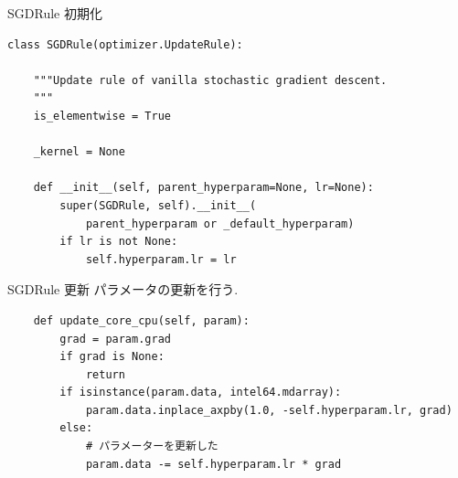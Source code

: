 \begin{frame}[fragile]{SGDRule 初期化}
\begin{verbatim}
class SGDRule(optimizer.UpdateRule):

    """Update rule of vanilla stochastic gradient descent.
    """
    is_elementwise = True

    _kernel = None

    def __init__(self, parent_hyperparam=None, lr=None):
        super(SGDRule, self).__init__(
            parent_hyperparam or _default_hyperparam)
        if lr is not None:
            self.hyperparam.lr = lr
\end{verbatim}
\end{frame}


\begin{frame}[fragile]{SGDRule 更新}
パラメータの更新を行う.

\begin{verbatim}
    def update_core_cpu(self, param):
        grad = param.grad
        if grad is None:
            return
        if isinstance(param.data, intel64.mdarray):
            param.data.inplace_axpby(1.0, -self.hyperparam.lr, grad)
        else:
            # パラメーターを更新した
            param.data -= self.hyperparam.lr * grad
\end{verbatim}
\end{frame}
